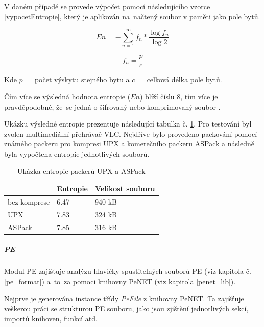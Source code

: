 V daném případě se provede výpočet pomocí následujícího vzorce \ref{vypocetEntropie}, který je aplikován na~načtený soubor v paměti jako pole bytů. 

\begin{equation}
    \label{vypocetEntropie}
    En=-\sum_{n=1}^{\infty} f_n * \frac{\log{f_n}}{\log{2}}
\end{equation}

\begin{equation}
    \label{vypocetEntropie_sub}
    f_n= \frac{p}{c}
\end{equation}

Kde $p =$ počet výskytu stejného bytu a $c =$ celková délka pole bytů.

Čím více se výsledná hodnota entropie ($En$) blíží číslu 8, tím více je pravděpodobné, že~se jedná o šifrovaný nebo komprimovaný soubor \cite{entropy}.


Ukázku výsledné entropie prezentuje následující tabulka č. \ref{entropy_table}. Pro testování byl zvolen multimediální přehrávač VLC. Nejdříve bylo provedeno packování pomocí známého packeru pro kompresi UPX a komerečního packeru ASPack a následně byla vypočtena entropie jednotlivých souborů.

\begin{table}[H]
    \centering

    \begin{tabular}{|l|l|l|}
        \hline
            & Entropie & Velikost souboru \\ \hline \hline
         bez komprese   &   6.47 & 940 kB \\ \hline
         UPX            &   7.83 & 324 kB \\ \hline
         ASPack         &   7.85 & 316 kB \\ \hline
    \end{tabular}
    
    \caption{Ukázka entropie packerů UPX a ASPack}
    \label{entropy_table}
\end{table}

\subparagraph*{PE}

Modul PE zajišťuje analýzu hlavičky spustitelných souborů PE (viz kapitola č. \ref{pe_format}) a~to~za pomoci knihovny PeNET (viz kapitola \ref{penet_lib}).

Nejprve je generována instance třídy \emph{PeFile} z knihovny PeNET. Ta zajišťuje veškerou práci se strukturou PE souboru, jako jsou zjištění jednotlivých sekcí, importů knihoven, funkcí atd. 

